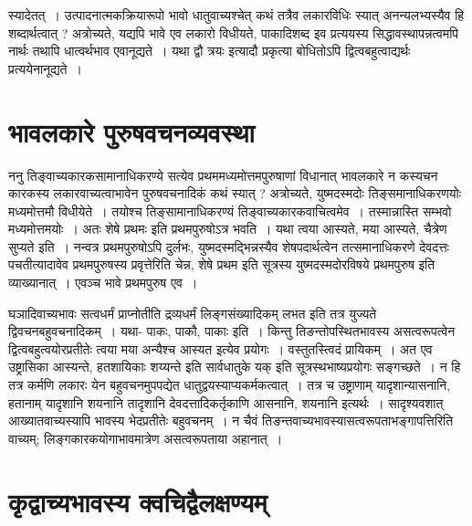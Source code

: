 {स्यादेतत्~। उत्पादनात्मकक्रियारूपो भावो धातुवाच्यश्चेत् कथं तत्रैव लकारविधिः स्यात् अनन्यलभ्यस्यैव हि शब्दार्थत्वात् ? अत्रोच्यते, यद्यपि भावे एव लकारो विधीयते, पाकादिशब्द इव प्रत्ययस्य सिद्धावस्थापन्नत्वमपि नार्थः तथापि धात्वर्थभाव एवानूद्यते~। यथा द्वौ त्रयः इत्यादौ प्रकृत्या बोधितोऽपि द्वित्वबहुत्वाद्यर्थः प्रत्ययेनानूद्यते~। 

\section*{भावलकारे पुरुषवचनव्यवस्था} 

ननु तिङ्वाच्यकारकसामानाधिकरण्ये सत्येव प्रथममध्यमोत्तमपुरुषाणां विधानात् भावलकारे न कस्यचन कारकस्य लकारवाच्यत्वाभावेन पुरुषवचनादिकं कथं स्यात् ? अत्रोच्यते, युष्मदस्मदोः तिङ्समानाधिकरणयोः मध्यमोत्तमौ विधीयेते~। तयोश्च तिङ्सामानाधिकरण्यं तिङ्वाच्यकारकवाचित्वमेव~। तस्मान्नास्ति सम्भवो मध्यमोत्तमयोः~। अतः शेषे प्रथमः इति प्रथमपुरुषोऽत्र भवति~। यथा त्वया आस्यते, मया आस्यते, चैत्रेण सुप्यते इति~। नन्वत्र प्रथमपुरुषोऽपि दुर्लभः, युष्मदस्मद्भिन्नस्यैव शेषपदार्थत्वेन तत्समानाधिकरणे देवदत्तः पचतीत्यादावेव प्रथमपुरुषस्य प्रवृत्तेरिति चेन्न, शेषे प्रथम इति सूत्रस्य युष्मदस्मदोरविषये प्रथमपुरुष इति व्याख्यानात्~। एवञ्च भावे प्रथमपुरुष एव~। 

घञादिवाच्यभावः सत्वधर्मं प्राप्नोतीति द्रव्यधर्मं लिङ्गसंख्यादिकम् लभत इति तत्र युज्यते द्विवचनबहुवचनादिकम्~। यथा- पाकः, पाकौ, पाकाः इति~। किन्तु तिङन्तोपस्थितभावस्य असत्वरूपत्वेन द्वित्वबहुत्वयोरप्रतीतेः त्वया मया अन्यैश्च आस्यत इत्येव प्रयोगः~। वस्तुतस्त्विदं प्रायिकम्~। अत एव उष्ट्रासिका आस्यन्ते, हतशायिकाः शय्यन्ते इति सार्वधातुके यक् इति सूत्रस्थभाष्यप्रयोगः सङ्गच्छते~। न हि तत्र कर्मणि लकारः येन बहुवचनमुपपद्येत धातुद्वयस्याप्यकर्मकत्वात्~। तत्र च उष्ट्राणाम् यादृशान्यासनानि, हतानाम् यादृशानि शयनानि तादृशानि देवदत्तादिकर्तृकाणि आसनानि, शयनानि इत्यर्थः~। सादृश्यवशात् आख्यातवाच्यस्यापि भावस्य भेदप्रतीतेः बहुवचनम्~। न चैवं तिङन्तवाच्यभावस्यासत्वरूपताभङ्गापत्तिरिति वाच्यम्; लिङ्गकारकयोगाभावमात्रेण असत्वरूपताया अहानात्~। 

\section*{कृद्वाच्यभावस्य क्वचिद्वैलक्षण्यम्} 

}
